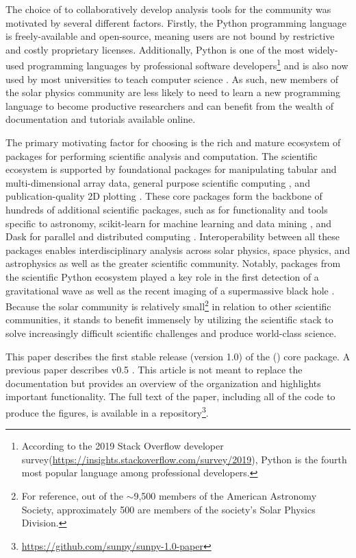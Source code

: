 The choice of \python to collaboratively develop analysis tools for the community was motivated by several different factors.
Firstly, the Python programming language is freely-available and open-source, meaning users are not bound by restrictive and costly proprietary licenses.
Additionally, Python is one of the most widely-used programming languages by professional software developers\footnote{According to the 2019 Stack Overflow developer survey(\url{https://insights.stackoverflow.com/survey/2019}), Python is the fourth most popular language among professional developers.} and is also now used by most universities to teach computer science \citep{guo2014}.
As such, new members of the solar physics community are less likely to need to learn a new programming language to become productive researchers and can benefit from the wealth of \python documentation and tutorials available online.

The primary motivating factor for choosing \python is the rich and mature ecosystem of packages for performing scientific analysis and computation. 
The scientific \python ecosystem is supported by foundational packages for manipulating tabular \citep[\pandas,][]{pandas} and multi-dimensional array\citep[\numpy,][]{numpy} data, general purpose scientific computing \citep[\scipy,][]{scipy}, and publication-quality 2D plotting \citep[\matplotlib,][]{matplotlib}. 
These core packages form the backbone of hundreds of additional scientific \python packages, such as \astropypkg for functionality and tools specific to astronomy, scikit-learn for machine learning and data mining \citep{pedregosa11}, and Dask for parallel and distributed computing \citep{rocklin15}. Interoperability between all these packages enables interdisciplinary analysis across solar physics, space physics, and astrophysics as well as the greater scientific community.
Notably, packages from the scientific Python ecosystem played a key role in the first detection of a gravitational wave \citep{ligo_scientific_collaboration_and_virgo_collaboration_observation_2016} as well as the recent imaging of a supermassive black hole \citep{collaboration_first_2019}.
Because the solar community is relatively small\footnote{For reference, out of the $\sim$9,500 members of the American Astronomy Society, approximately 500 are members of the society's Solar Physics Division.} in relation to other scientific communities, it stands to benefit immensely by utilizing the \python scientific stack to solve increasingly difficult scientific challenges and produce world-class science.

This paper describes the first stable release (version 1.0) of the (\sunpypkg) core package.
A previous paper describes v0.5 \citep{Community:2015cy}.
This article is not meant to replace the \sunpypkg documentation but provides an overview of the organization and highlights important functionality.
The full text of the paper, including all of the code to produce the figures, is available in a \github repository\footnote{\url{https://github.com/sunpy/sunpy-1.0-paper}}.